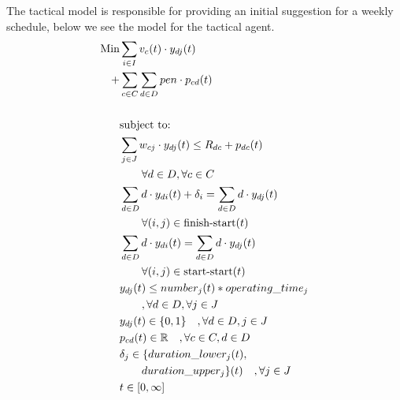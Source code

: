 The tactical model is responsible for providing an initial suggestion for a weekly schedule, below we see the model for the tactical agent.
\begin{alignat}{2}
\text{Min}     & \sum_{i \in I} v_{c}(t) \cdot y_{dj}(t)                                                      \\  
	         + & \sum_{c \in C} \sum_{d \in D} pen \cdot p_{cd}(t)                                               \\  
			                                                                                                  \\
               &\text{subject to:}                                                          \notag                                                                   \\
	           & \sum_{j \in J} w_{cj} \cdot y_{dj}(t)  \leq R_{dc} + p_{dc}(t)                                   \\ 
			   & \quad \quad \forall  d \in D, \forall c \in C                              \notag                                    \\ 
	           & \sum_{d \in D} d \cdot y_{di}(t) + \delta_i  = \sum_{d \in D} d \cdot y_{dj}(t)                    \\ 
			   & \quad \quad \forall (i, j) \in \text{finish-start}(t)                        \notag                                   \\ 
	           & \sum_{d \in D} d \cdot y_{di}(t) = \sum_{d \in D} d \cdot y_{dj}(t)                                \\ 
			   & \quad \quad \forall (i, j) \in \text{start-start}(t)                          \notag                             \\ 
			   & y_{dj}(t) \leq number_j(t) * operating\_time_j                                                     \\ 
			   & \quad \quad ,\forall d \in D, \forall j \in J                              \notag                                    \\
			   & y_{dj}(t) \in \{0, 1\} \quad ,\forall d \in D, j \in J                                          \\
			   & p_{cd}(t) \in \mathbb{R} \quad ,\forall c \in C, d \in D                                        \\
			   & \delta_j \in \{ duration\_lower_j(t),                                                           \\ 
			   & \quad \quad duration\_upper_j \}(t) \quad, \forall j \in J \notag                                      \\
			   & t \in  [0, \infty] 
\end{alignat}

